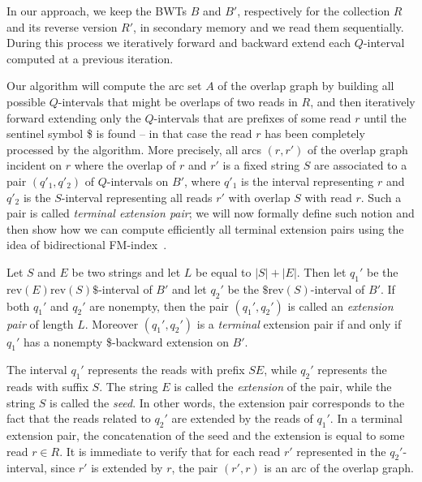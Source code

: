 \documentclass[runningheads,envcountsame,a4paper]{llncs}
\newcommand{\rev}{\ensuremath{\mathrm{rev}}}
\begin{document}
In our approach, we keep the BWTs $B$  and  $B'$, respectively  for the collection $R$ and its
reverse version $R'$,  in secondary memory and we read them sequentially.
During this process we iteratively forward and backward extend each
$Q$-interval computed at a previous iteration.

Our algorithm  will compute the arc set $A$  of the overlap graph
by building all possible $Q$-intervals that might be overlaps of two
reads in $R$, and then iteratively forward extending only the $Q$-intervals that
are prefixes of some read $r$ until the sentinel symbol \$ is
found -- in that case the read $r$ has been completely processed by the algorithm.
More precisely,    all arcs    $(r,r')$ of the overlap graph incident on $r$ where the overlap of $r$ and $r'$ is a fixed string $S$ are  associated to a pair  $(q'_1, q'_2)$ of $Q$-intervals on $B'$,
where $q'_1$ is the interval  representing   $r$ and $q'_2$ is the  $S$-interval representing all reads
 $r'$ with overlap $S$ with read $r$. Such a pair is called {\em terminal
extension pair}; we will now  formally define such notion and then show how we
can compute efficiently all terminal extension pairs
using the idea of bidirectional FM-index~\cite{Lam2009}.

\begin{definition}\label{def:extension-pair}
Let $S$ and $E$ be two strings and let $L$ be equal to $|S|+|E|$.
Then let $q_{1}'$ be the $\rev(E)\rev(S)\$$-interval of $B'$ and let  $q_{2}'$ be the $\$\rev(S)$-interval of $B'$.
If both $q_{1}'$ and  $q_{2}'$ are nonempty, then the pair  $(q_{1}', q_{2}')$ is called
an \emph{extension pair} of length $L$.
Moreover $(q_{1}', q_{2}')$ is a \emph{terminal} extension pair
if and only if $q_{1}'$ has a nonempty \$-backward extension on $B'$.
\end{definition}

The interval $q_{1}'$ represents   the reads with prefix $SE$, while $q_{2}'$
represents the reads with suffix $S$.
The  string $E$ is called the \emph{extension} of the
pair, while the string $S$ is called the \emph{seed}.
In other words, the extension pair corresponds to the fact that the reads related to $q_{2}'$ are extended by the reads
of $q_{1}'$.
In a terminal extension pair, the concatenation of the seed and the extension is
equal to some read $r \in R$.
It is immediate to verify  that for each read $r'$ represented in the $q_{2}'$-interval, since $r'$ is extended by $r$,
the pair $(r', r)$ is an arc of the overlap graph.
\end{document}
